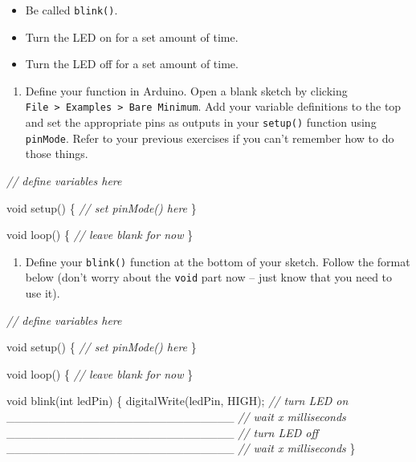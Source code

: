 \documentclass[]{book}
\newenvironment{Shaded}{\begin{snugshade}}{\end{snugshade}}
\newcommand{\CommentTok}[1]{\textcolor[rgb]{0.56,0.35,0.01}{\textit{#1}}}
\newcommand{\DataTypeTok}[1]{\textcolor[rgb]{0.13,0.29,0.53}{#1}}
\newcommand{\NormalTok}[1]{#1}
\providecommand{\tightlist}{%
  \setlength{\itemsep}{0pt}\setlength{\parskip}{0pt}}
\begin{document}
\begin{itemize}
\tightlist
\item
  Be called \texttt{blink()}.
\item
  Turn the LED on for a set amount of time.
\item
  Turn the LED off for a set amount of time.
\end{itemize}

\begin{enumerate}
\def\labelenumi{\arabic{enumi}.}
\setcounter{enumi}{1}
\tightlist
\item
  Define your function in Arduino. Open a blank sketch by clicking \texttt{File\ \textgreater{}\ Examples\ \textgreater{}\ Bare\ Minimum}. Add your variable definitions to the top and set the appropriate pins as outputs in your \texttt{setup()} function using \texttt{pinMode}. Refer to your previous exercises if you can't remember how to do those things.
\end{enumerate}

\begin{Shaded}
\begin{Highlighting}[]
  \CommentTok{// define variables here}
  
  \DataTypeTok{void}\NormalTok{ setup() \{}
    \CommentTok{// set pinMode() here}
\NormalTok{  \}}
  
  \DataTypeTok{void}\NormalTok{ loop() \{}
    \CommentTok{// leave blank for now}
\NormalTok{  \}}
\end{Highlighting}
\end{Shaded}

\begin{enumerate}
\def\labelenumi{\arabic{enumi}.}
\setcounter{enumi}{2}
\tightlist
\item
  Define your \texttt{blink()} function at the bottom of your sketch. Follow the format below (don't worry about the \texttt{void} part now -- just know that you need to use it).
\end{enumerate}

\begin{Shaded}
\begin{Highlighting}[]
  \CommentTok{// define variables here}
  
  \DataTypeTok{void}\NormalTok{ setup() \{}
    \CommentTok{// set pinMode() here}
\NormalTok{  \}}
  
  \DataTypeTok{void}\NormalTok{ loop() \{}
    \CommentTok{// leave blank for now}
\NormalTok{  \}}
  
  \DataTypeTok{void}\NormalTok{ blink(}\DataTypeTok{int}\NormalTok{ ledPin) \{}
\NormalTok{    digitalWrite(ledPin, HIGH); }\CommentTok{// turn LED on}
\NormalTok{    ___________________________ }\CommentTok{// wait x milliseconds}
\NormalTok{    ___________________________ }\CommentTok{// turn LED off}
\NormalTok{    ___________________________ }\CommentTok{// wait x milliseconds}
\NormalTok{  \}}
\end{Highlighting}
\end{Shaded}
\end{document}
